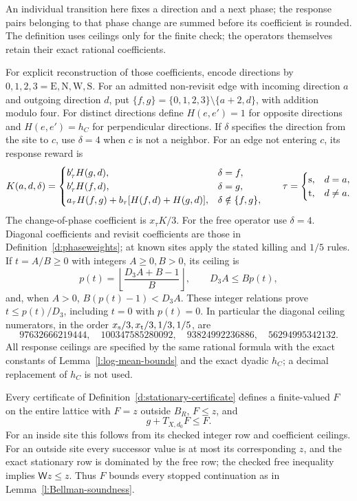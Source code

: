 An individual transition here fixes a direction and a next phase;
the response pairs belonging to that phase change are summed before
its coefficient is rounded. The definition uses ceilings only for
the finite check; the operators themselves retain their exact
rational coefficients.

For explicit reconstruction of those coefficients, encode directions
by \(0,1,2,3=\mathrm E,\mathrm N,\mathrm W,\mathrm S\).
For an admitted non-revisit edge with incoming direction \(a\)
and outgoing direction \(d\), put
\(\{f,g\}=\{0,1,2,3\}\setminus\{a+2,d\}\), with addition
modulo four. For distinct directions define
\(H(e,e')=1\) for opposite directions and \(H(e,e')=h_C\)
for perpendicular directions. If \(\delta\) specifies the direction
from the site to \(c\), use \(\delta=4\) when \(c\) is not a
neighbor. For an edge not entering \(c\), its response reward is
\[
 K(a,d,\delta)=
 \begin{cases}
 b'_\tau H(g,d),&\delta=f,\\
 b'_\tau H(f,d),&\delta=g,\\
 a_\tau H(f,g)+b_\tau[H(f,d)+H(g,d)],&\delta\notin\{f,g\},
 \end{cases}
 \qquad \tau=\begin{cases}{\rm s},&d=a,\\{\rm t},&d\ne a.\end{cases}
\]
The change-of-phase coefficient is \(x_\tau K/3\). For the free
operator use \(\delta=4\). Diagonal coefficients and revisit
coefficients are those in Definition~\ref{d:phaseweights};
at known sites apply the stated killing and \(1/5\) rules.
If \(t=A/B\ge0\) with integers \(A\ge0,B>0\), its ceiling is
\[
 p(t)=\left\lfloor\frac{D_3A+B-1}{B}\right\rfloor,
 \qquad D_3A\le Bp(t),
\]
and, when \(A>0\), \(B(p(t)-1)<D_3A\). These integer relations
prove \(t\le p(t)/D_3\), including \(t=0\) with \(p(t)=0\).
In particular the diagonal ceiling numerators, in the order
\(x_{\rm s}/3,x_{\rm t}/3,1/3,1/5\), are
\[
 97632666219444,\quad100347585280092,\quad
 93824992236886,\quad56294995342132 .
\]
All response ceilings are specified by the same rational formula
with the exact constants of Lemma~\ref{l:log-mean-bounds} and the
exact dyadic \(h_C\); a decimal replacement of \(h_C\) is not used.

\begin{lemma}\label{l:stationary-local-global}
Every certificate of Definition~\ref{d:stationary-certificate}
defines a finite-valued \(F\) on the entire lattice with
\(F=z\) outside \(B_R\), \(F\le z\), and
\[
 g+T_{X,d_0}F\le F .
\]
For an inside site this follows from its checked integer row and
coefficient ceilings. For an outside site every successor value
is at most its corresponding \(z\), and the exact stationary row
is dominated by the free row; the checked free inequality
implies \(\mathsf Wz\le z\).
Thus \(F\) bounds every stopped continuation as in
Lemma~\ref{l:Bellman-soundness}.
\end{lemma}

